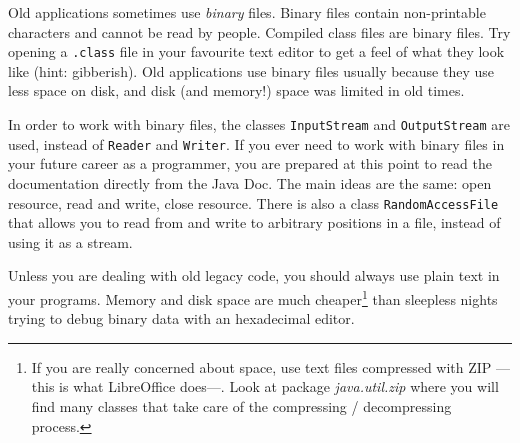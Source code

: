 Old applications sometimes use \emph{binary} files. Binary files
contain non-printable characters and cannot be read by
people. Compiled class files are binary files. Try
opening a \verb+.class+ file in your favourite text editor to get a
feel of what they look like (hint: gibberish). Old applications use
binary files usually because they use less space on disk, and disk (and
memory!) space was limited in old times. 

In order to work with binary files, the classes \verb+InputStream+ and
\verb+OutputStream+ are used, instead of \verb+Reader+ and
\verb+Writer+. If you ever need to work with binary files in your
future career as a programmer, you are prepared at this point to read
the documentation directly from the Java Doc. The main ideas are the
same: open resource, read and write, close resource. There is also a
class \verb+RandomAccessFile+ that allows you to read from and write
to arbitrary positions in a file, instead of using it as a stream. 

Unless you are dealing with old legacy code, you should always use
plain text in your programs. Memory and disk space are much 
cheaper\footnote{If you are really concerned about space, use text
  files compressed with ZIP ---this is what LibreOffice does---. Look
  at package \emph{java.util.zip} where you will find many classes
  that take care of the compressing / decompressing process.} 
than sleepless nights trying to debug binary data with an
hexadecimal editor. 





